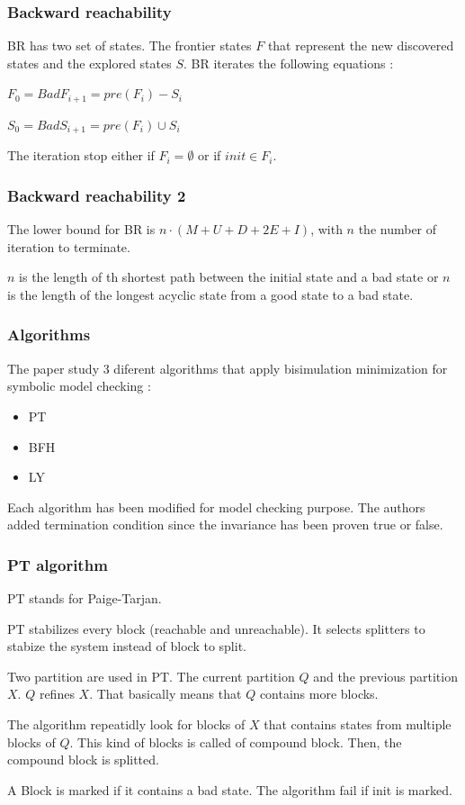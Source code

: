\documentclass[11pt,handout]{beamer}
\begin{document}
\begin{frame}
 \frametitle{Backward reachability}
 BR has two set of states. The frontier states $F$ that represent the new discovered states and the explored states $S$.
 BR iterates the following equations : \vspace{10pt}
 
 $F_0 = Bad
 
 F_{i + 1} = pre(F_i) - S_i$ \vspace{10pt}
 
 $S_0 = Bad
 
 S_{i + 1} = pre(F_i) \cup S_i$ \vspace{10pt}
 
 The iteration stop either if $F_i = \emptyset$ or if $init \in F_i$.
\end{frame}

\begin{frame}
 \frametitle{Backward reachability 2}
 The lower bound for BR is $n \cdot (M + U + D + 2E + I)$, with $n$ the number of iteration to terminate.
 
 $n$ is the length of th shortest path between the initial state and a bad state or $n$ is the length of the longest acyclic state from a good state to a bad state.
\end{frame}

\begin{frame}
 \frametitle{Algorithms}
 The paper study 3 diferent algorithms that apply bisimulation minimization for symbolic model checking : \vspace{10pt}
 
 \begin{itemize}
  \item PT
  \item BFH
  \item LY
 \end{itemize} \vspace{10pt}
 
 Each algorithm has been modified for model checking purpose. The authors added termination condition since the invariance has been proven true or false.
 \end{frame}

\begin{frame}
 \frametitle{PT algorithm}
 PT stands for Paige-Tarjan.
 
 PT stabilizes every block (reachable and unreachable). It selects splitters to stabize the system instead of block to split.

 Two partition are used in PT. The current partition $Q$ and the previous partition $X$. $Q$ refines $X$. That basically means that $Q$ contains more blocks.
 
 The algorithm repeatidly look for blocks of $X$ that contains states from multiple blocks of $Q$. This kind of blocks is called of compound block.
 Then, the compound block is splitted.
 
 A Block is marked if it contains a bad state. The algorithm fail if init is marked.
\end{frame}
\end{document}
